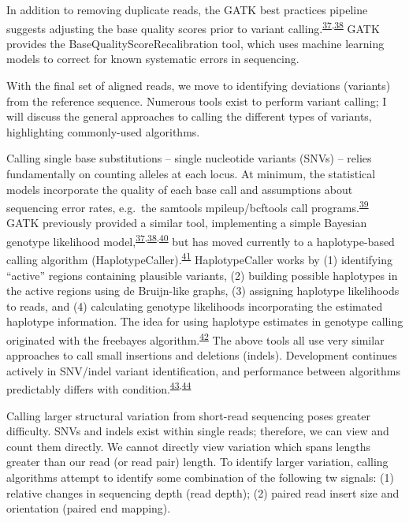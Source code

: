 \documentclass[11pt,letterpaper]{book}
\begin{document}
In addition to removing duplicate reads, the GATK best practices pipeline suggests adjusting the base quality scores prior to variant calling.\textsuperscript{\protect\hyperlink{ref-mckenna:2010aa}{37},\protect\hyperlink{ref-depristo:2011aa}{38}}
GATK provides the BaseQualityScoreRecalibration tool, which uses machine learning models to correct for known systematic errors in sequencing.

With the final set of aligned reads, we move to identifying deviations (variants) from the reference sequence.
Numerous tools exist to perform variant calling; I will discuss the general approaches to calling the different types of variants, highlighting commonly-used algorithms.

Calling single base substitutions -- single nucleotide variants (SNVs) -- relies fundamentally on counting alleles at each locus.
At minimum, the statistical models incorporate the quality of each base call and assumptions about sequencing error rates, e.g.~the samtools mpileup/bcftools call programs.\textsuperscript{\protect\hyperlink{ref-li:2011aa}{39}}
GATK previously provided a similar tool, implementing a simple Bayesian genotype likelihood model,\textsuperscript{\protect\hyperlink{ref-mckenna:2010aa}{37},\protect\hyperlink{ref-depristo:2011aa}{38},\protect\hyperlink{ref-van-der-auwera:2013aa}{40}} but has moved currently to a haplotype-based calling algorithm (HaplotypeCaller).\textsuperscript{\protect\hyperlink{ref-poplin:2018aa}{41}}
HaplotypeCaller works by (1) identifying ``active'' regions containing plausible variants, (2) building possible haplotypes in the active regions using de Bruijn-like graphs, (3) assigning haplotype likelihoods to reads, and (4) calculating genotype likelihoods incorporating the estimated haplotype information.
The idea for using haplotype estimates in genotype calling originated with the freebayes algorithm.\textsuperscript{\protect\hyperlink{ref-garrison:2012aa}{42}}
The above tools all use very similar approaches to call small insertions and deletions (indels).
Development continues actively in SNV/indel variant identification, and performance between algorithms predictably differs with condition.\textsuperscript{\protect\hyperlink{ref-chen:2019aa}{43},\protect\hyperlink{ref-xu:2018aa}{44}}

Calling larger structural variation from short-read sequencing poses greater difficulty.
SNVs and indels exist within single reads; therefore, we can view and count them directly.
We cannot directly view variation which spans lengths greater than our read (or read pair) length.
To identify larger variation, calling algorithms attempt to identify some combination of the following tw signals: (1) relative changes in sequencing depth (read depth); (2) paired read insert size and orientation (paired end mapping).
\end{document}
